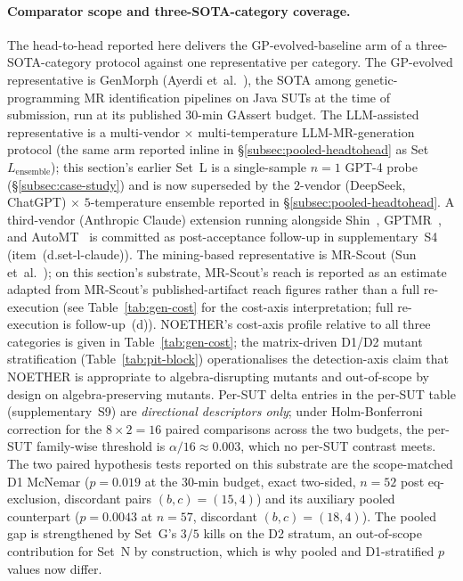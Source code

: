 \documentclass[manuscript]{acmart}
\begin{document}
\paragraph{Comparator scope and three-SOTA-category coverage.}
The head-to-head reported here delivers the GP-evolved-baseline arm
of a three-SOTA-category protocol against one representative per
category. The GP-evolved representative is GenMorph (Ayerdi
et~al.~\cite{GenMorph2024}), the SOTA among
genetic-programming MR identification pipelines on Java SUTs at the
time of submission, run at its published 30-min GAssert budget. The
LLM-assisted representative is a multi-vendor $\times$
multi-temperature LLM-MR-generation protocol (the same arm reported
inline in \S\ref{subsec:pooled-headtohead} as Set~$L_{\mathrm{ensemble}}$);
this section's earlier Set~L is a single-sample $n = 1$ GPT-4 probe
(\S\ref{subsec:case-study}) and is now superseded by the
$2$-vendor (DeepSeek, ChatGPT) $\times$ $5$-temperature ensemble
reported in \S\ref{subsec:pooled-headtohead}. A third-vendor
(Anthropic Claude) extension running alongside
Shin~\cite{Shin2024}, GPTMR~\cite{GPTMR2025}, and
AutoMT~\cite{AutoMT2025} is committed as
post-acceptance follow-up in supplementary~S4 (item~(d.set-l-claude)). The
mining-based representative is MR-Scout (Sun
et~al.~\cite{MRScout2024}); on this section's substrate, MR-Scout's
reach is reported as an estimate adapted from MR-Scout's
published-artifact reach figures rather than a full re-execution
(see Table~\ref{tab:gen-cost} for the cost-axis interpretation;
full re-execution is follow-up~(d)). NOETHER's cost-axis profile
relative to all three categories is given in
Table~\ref{tab:gen-cost}; the matrix-driven D1/D2 mutant
stratification (Table~\ref{tab:pit-block}) operationalises the
detection-axis claim that NOETHER is appropriate to algebra-disrupting
mutants and out-of-scope by design on algebra-preserving mutants.
Per-SUT delta entries in the per-SUT table (supplementary~S9) are
\emph{directional descriptors only}; under Holm-Bonferroni
correction for the $8 \times 2 = 16$ paired comparisons across the
two budgets, the per-SUT family-wise threshold is $\alpha/16 \approx
0.003$, which no per-SUT contrast meets. The two paired hypothesis
tests reported on this substrate are the scope-matched D1 McNemar
($p = 0.019$ at the 30-min budget, exact two-sided, $n = 52$ post
eq-exclusion, discordant pairs $(b, c) = (15, 4)$) and its
auxiliary pooled counterpart ($p = 0.0043$ at $n = 57$, discordant
$(b, c) = (18, 4)$). The pooled gap is strengthened by Set~G's
$3/5$ kills on the D2 stratum, an out-of-scope contribution
for Set~N by construction, which is why pooled and D1-stratified
$p$ values now differ.
\end{document}
